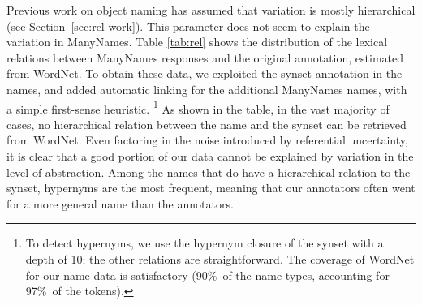 Previous work on object naming has assumed that variation is mostly hierarchical (see Section~\ref{sec:rel-work}).
This parameter does not seem to explain the variation in ManyNames. 
Table \ref{tab:rel} shows the distribution of the lexical relations between ManyNames responses and the original \vg annotation, estimated from WordNet.
To obtain these data, we exploited the synset annotation in the \vg names, and added automatic linking for the additional ManyNames names, with a simple first-sense heuristic.%
\footnote{To detect hypernyms, we use the hypernym closure of the synset with a depth of 10; the other relations are straightforward. The coverage of WordNet for our name data is satisfactory (90\%\ of the name types, accounting for 97\%\ of the tokens).}
As shown in the table, in the vast majority of cases, no hierarchical relation between the name and the synset can be retrieved from WordNet.
Even factoring in the noise introduced by referential uncertainty, it is clear that a good portion of our data cannot be explained by variation in the level of abstraction. 
Among the names that do have a hierarchical relation to the synset, hypernyms are the most frequent, meaning that our annotators often went for a more general name than the \vg annotators.
%

